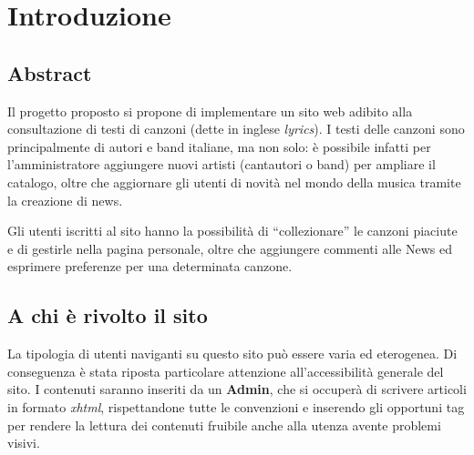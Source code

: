 \section{Introduzione}

\subsection{Abstract}
Il progetto proposto si propone di implementare un sito web adibito alla consultazione di testi di canzoni (dette in inglese \textit{lyrics}).
I testi delle canzoni sono principalmente di autori e band italiane, ma non solo: è possibile infatti per l'amministratore aggiungere nuovi artisti (cantautori o band) per ampliare il catalogo, oltre che aggiornare gli utenti di novità nel mondo della musica tramite la creazione di news.

Gli utenti iscritti al sito hanno la possibilità di ``collezionare'' le canzoni piaciute e di gestirle nella pagina personale, oltre che aggiungere commenti alle News ed esprimere preferenze per una determinata canzone.


\subsection{A chi è rivolto il sito}
La tipologia di utenti naviganti su questo sito può essere varia ed eterogenea. Di conseguenza è stata riposta particolare attenzione all'accessibilità generale del sito. I contenuti saranno inseriti da un \textbf{Admin}, che si occuperà di scrivere articoli in formato \textit{xhtml}, rispettandone tutte le convenzioni e inserendo gli opportuni tag per rendere la lettura dei contenuti fruibile anche alla utenza avente problemi visivi.
